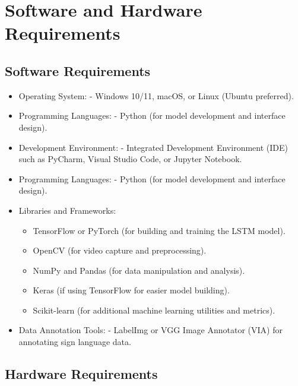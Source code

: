 \chapter{Software and Hardware Requirements}
\section{Software Requirements}

\begin{itemize}
    \item Operating System:
   - Windows 10/11, macOS, or Linux (Ubuntu preferred).

    \item Programming Languages:
   - Python (for model development and interface design).

    \item  Development Environment:
   - Integrated Development Environment (IDE) such as PyCharm, Visual Studio Code, or Jupyter Notebook.

    \item Programming Languages:
   - Python (for model development and interface design).

    \item Libraries and Frameworks:
    \begin{itemize}
        \item TensorFlow or PyTorch (for building and training the LSTM model).
        \item OpenCV (for video capture and preprocessing).
        \item NumPy and Pandas (for data manipulation and analysis).
        \item Keras (if using TensorFlow for easier model building).
        \item Scikit-learn (for additional machine learning utilities and metrics).
    \end{itemize}


  \item Data Annotation Tools:
   - LabelImg or VGG Image Annotator (VIA) for annotating sign language data.


 


\end{itemize}
\newpage
\section{ Hardware Requirements}


